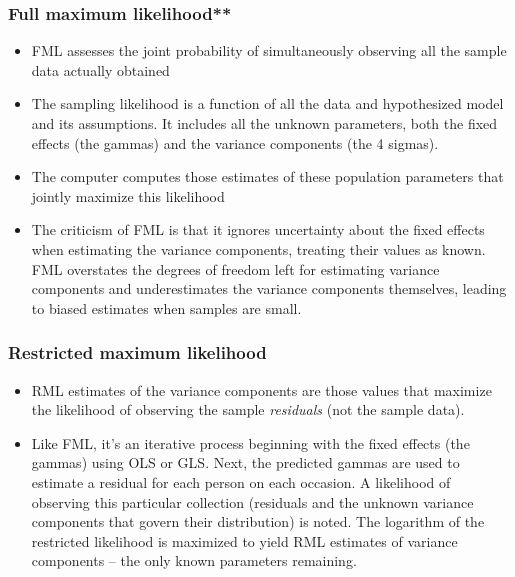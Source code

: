 \documentclass[
  english,
]{book}
\providecommand{\tightlist}{%
  \setlength{\itemsep}{0pt}\setlength{\parskip}{0pt}}
\begin{document}
\hypertarget{full-maximum-likelihood}{%
\subsubsection{Full maximum likelihood**}\label{full-maximum-likelihood}}

\begin{itemize}
\tightlist
\item
  FML assesses the joint probability of simultaneously observing all the sample data actually obtained
\item
  The sampling likelihood is a function of all the data and hypothesized model and its assumptions. It includes all the unknown parameters, both the fixed effects (the gammas) and the variance components (the 4 sigmas).
\item
  The computer computes those estimates of these population parameters that jointly maximize this likelihood
\item
  The criticism of FML is that it ignores uncertainty about the fixed effects when estimating the variance components, treating their values as known. FML overstates the degrees of freedom left for estimating variance components and underestimates the variance components themselves, leading to biased estimates when samples are small.
\end{itemize}

\hypertarget{restricted-maximum-likelihood}{%
\subsubsection{Restricted maximum likelihood}\label{restricted-maximum-likelihood}}

\begin{itemize}
\tightlist
\item
  RML estimates of the variance components are those values that maximize the likelihood of observing the sample \emph{residuals} (not the sample data).
\item
  Like FML, it's an iterative process beginning with the fixed effects (the gammas) using OLS or GLS. Next, the predicted gammas are used to estimate a residual for each person on each occasion. A likelihood of observing this particular collection (residuals and the unknown variance components that govern their distribution) is noted. The logarithm of the restricted likelihood is maximized to yield RML estimates of variance components -- the only known parameters remaining.
\end{itemize}
\end{document}
